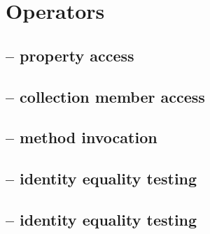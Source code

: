 \chapter{Operators}

\section{ -- property access}
\section{\indexoperator{[]} -- collection member access}
\section{\indexoperator{()} -- method invocation}
\section{\indexoperator{==} -- identity equality testing}
\section{\indexoperator{!=} -- identity equality testing}
